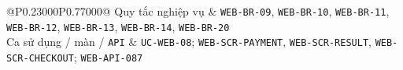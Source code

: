 \begin{longtable}{@{}P{0.23000\SRSWidth}P{0.77000\SRSWidth}@{}}
Quy tắc nghiệp vụ & \texttt{WEB-\allowbreak{}BR-\allowbreak{}09}, \texttt{WEB-\allowbreak{}BR-\allowbreak{}10}, \texttt{WEB-\allowbreak{}BR-\allowbreak{}11}, \texttt{WEB-\allowbreak{}BR-\allowbreak{}12}, \texttt{WEB-\allowbreak{}BR-\allowbreak{}13}, \texttt{WEB-\allowbreak{}BR-\allowbreak{}14}, \texttt{WEB-\allowbreak{}BR-\allowbreak{}20} \\[3pt]
Ca sử dụng /\allowbreak{} màn /\allowbreak{} \texttt{API} & \texttt{UC-\allowbreak{}WEB-\allowbreak{}08}; \texttt{WEB-\allowbreak{}SCR-\allowbreak{}PAYMENT}, \texttt{WEB-\allowbreak{}SCR-\allowbreak{}RESULT}, \texttt{WEB-\allowbreak{}SCR-\allowbreak{}CHECKOUT\allowbreak{}}; \texttt{WEB-\allowbreak{}API-\allowbreak{}087} \\[3pt]
\end{longtable}
\endgroup

